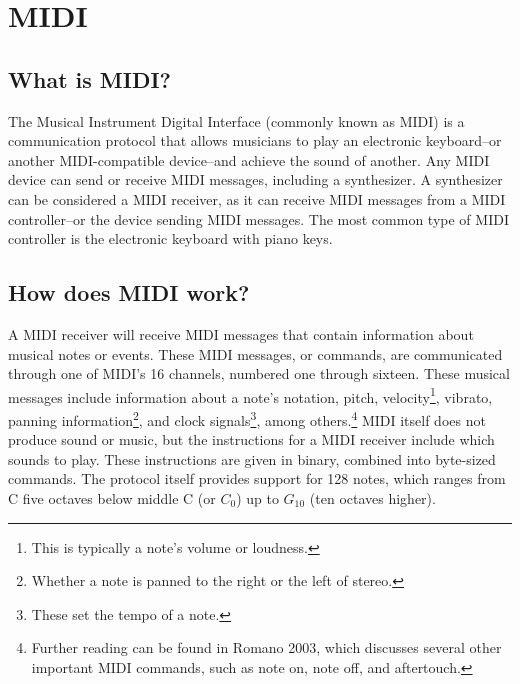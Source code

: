\section[MIDI: An Introduction]{MIDI}\label{midi}

\subsection[What is MIDI?]{What is MIDI?}\label{what-midi}

The Musical Instrument Digital Interface (commonly known as MIDI) is a communication protocol that allows musicians to play an electronic keyboard--or another MIDI-compatible device--and achieve the sound of another. Any MIDI device can send or receive MIDI messages, including a synthesizer. A synthesizer can be considered a MIDI receiver, as it can receive MIDI messages from a MIDI controller--or the device sending MIDI messages. The most common type of MIDI controller is the electronic keyboard with piano keys.

\subsection[How does MIDI work?]{How does MIDI work?}\label{how-midi}

A MIDI receiver will receive MIDI messages that contain information about musical notes or events. These MIDI messages, or commands, are communicated through one of MIDI's 16 channels, numbered one through sixteen. These musical messages include information about a note's notation, pitch, velocity\footnote{This is typically a note's volume or loudness.}, vibrato, panning information\footnote{Whether a note is panned to the right or the left of stereo.}, and clock signals\footnote{These set the tempo of a note.}, among others.\footnote{Further reading can be found in Romano 2003, which discusses several other important MIDI commands, such as note on, note off, and aftertouch.} MIDI itself does not produce sound or music, but the instructions for a MIDI receiver include which sounds to play. These instructions are given in binary, combined into byte-sized commands. The protocol itself provides support for 128 notes, which ranges from C five octaves below middle C (or $C_0$) up to $G_{10}$ (ten octaves higher).
